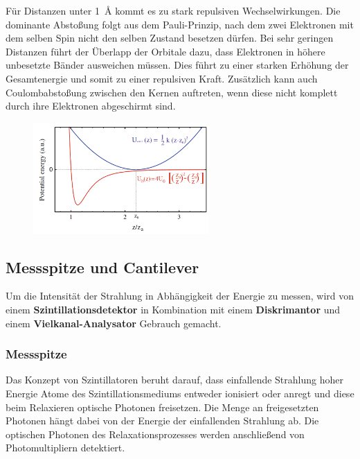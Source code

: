         Für Distanzen unter \SI{1}{\angstrom} kommt es zu stark repulsiven Wechselwirkungen. Die dominante Abstoßung folgt aus dem Pauli-Prinzip, nach dem zwei Elektronen mit dem selben Spin nicht den selben 
        Zustand besetzen dürfen. Bei sehr geringen Distanzen führt der Überlapp der Orbitale dazu, dass Elektronen in höhere unbesetzte Bänder ausweichen müssen. Dies führt zu einer starken Erhöhung der 
        Gesamtenergie und somit zu einer repulsiven Kraft. Zusätzlich kann auch Coulombabstoßung zwischen den Kernen auftreten, wenn diese nicht komplett durch ihre Elektronen abgeschirmt sind.

        \FloatBarrier

        \begin{figure}[h]
          \centering
          \includegraphics[width = 0.6\textwidth]{pictures/Potentiale.png}
          \caption{}
          \label{fig:Potentiale}
        \end{figure}

        \FloatBarrier


        

      \newpage


      \subsection{Messspitze und Cantilever}
        Um die Intensität der Strahlung in Abhängigkeit der Energie zu messen, wird von einem \textbf{Szintillationsdetektor} in Kombination mit einem \textbf{Diskrimantor} und einem 
        \textbf{Vielkanal-Analysator} Gebrauch gemacht.

        \subsubsection*{Messspitze}
          Das Konzept von Szintillatoren beruht darauf, dass einfallende Strahlung hoher Energie Atome des Szintillationsmediums entweder ionisiert oder anregt und 
          diese beim Relaxieren optische Photonen freisetzen. Die Menge an freigesetzten Photonen hängt dabei von der Energie der einfallenden Strahlung ab. Die optischen Photonen des Relaxationsprozesses 
          werden anschließend von Photomultipliern detektiert. %
        \newpage
